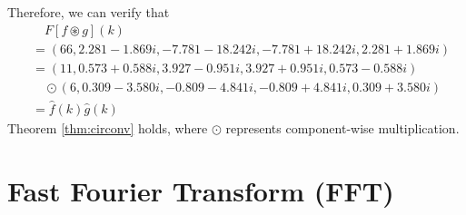 \begin{solution}
Therefore, we can verify that
\begin{align*}
&\quad F[f \circledast g](k) \\
&= (66, 2.281 - 1.869i, -7.781 - 18.242i, -7.781 + 18.242i, 2.281 + 1.869i) \\
&= (11, 0.573+0.588i, 3.927-0.951i, 3.927+0.951i, 0.573-0.588i) \\
&\quad \odot (6, 0.309-3.580i, -0.809-4.841i, -0.809+4.841i, 0.309+3.580i) \\
&= \hat{f}(k)\hat{g}(k)
\end{align*}
Theorem \ref{thm:circonv} holds, where $\odot$ represents component-wise multiplication.
\end{solution}

\section{Fast Fourier Transform (FFT)}

